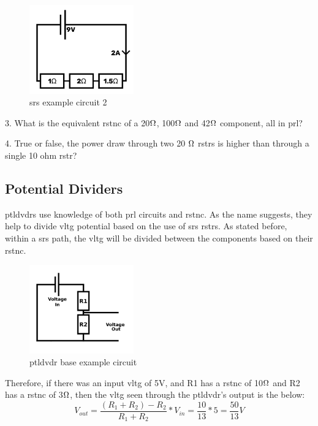 \documentclass[a4paper,11pt]{report}
\begin{document}
\begin{figure}[H]
\centering
\includegraphics[width=0.4\textwidth]{series3}
\caption{\gls{srs} example circuit 2}
\end{figure}

3. What is the equivalent \gls{rstnc} of a 20$\ohm$, 100$\ohm$ and 42$\ohm$ component, all in \gls{prl}?

4. True or false, the power draw through two  20 $\ohm$ \gls{rstr}s is higher than through a single 10 ohm \gls{rstr}?

\vspace*{1\baselineskip}

\subsection{Potential Dividers}

\gls{ptldvdr}s use knowledge of both \gls{prl} circuits and \gls{rstnc}. As the name suggests, they help to divide \gls{vltg} potential based on the use of \gls{srs} \gls{rstr}s. As stated before, within a \gls{srs} path, the \gls{vltg} will be divided between the components based on their \gls{rstnc}.

\begin{figure}[H]
\centering
\includegraphics[width=0.4\textwidth]{PotentialDivider}
\caption{\gls{ptldvdr} base example circuit}
\end{figure}

Therefore, if there was an input \gls{vltg} of 5V, and R1 has a \gls{rstnc} of 10$\ohm$ and R2 has a \gls{rstnc} of 3$\ohm$, then the \gls{vltg} seen through the \gls{ptldvdr}'s output is the below:
\[V_{out}=\frac{(R_1+R_2)-R_2}{R_1+R_2}*V_{in} = \frac{10}{13}*5 = \frac{50}{13}V\]
\end{document}
